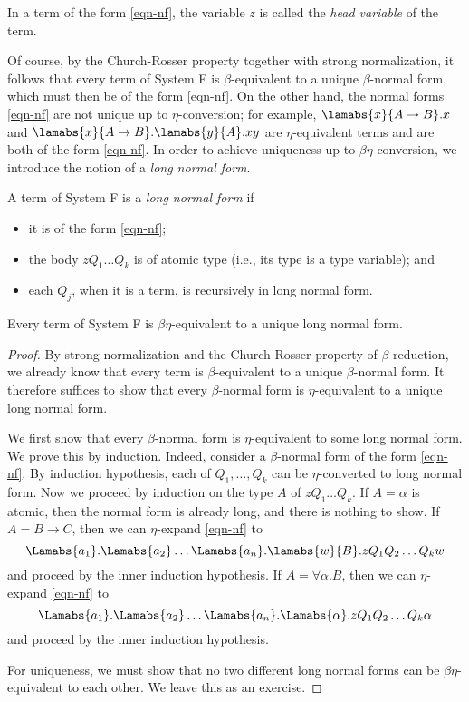 \documentclass[12pt]{article}
\begin{document}
\begin{definition}
  In a term of the form {\eqref{eqn-nf}}, the variable $z$ is called
  the {\em head variable} of the term.
\end{definition}

Of course, by the Church-Rosser property together with strong
normalization, it follows that every term of System F is
$\beta$-equivalent to a unique $\beta$-normal form, which must then be
of the form {\eqref{eqn-nf}}. On the other hand, the normal forms
{\eqref{eqn-nf}} are not unique up to $\eta$-conversion; for example,
$\lamabs{x}{A\to B}.x$ and $\lamabs{x}{A\to B}.\lamabs{y}{A}.xy$ are
$\eta$-equivalent terms and are both of the form {\eqref{eqn-nf}}. 
In order to achieve uniqueness up to $\beta\eta$-conversion, we
introduce the notion of a {\em long normal form}.

\begin{definition}
  A term of System F is a {\em long normal form} if
  \begin{itemize}
  \item it is of the form {\eqref{eqn-nf}};
  \item the body $zQ_1\ldots Q_k$ is of atomic type (i.e., its type is
    a type variable); and
  \item each $Q_j$, when it is a term, is recursively in long normal form.
  \end{itemize}
\end{definition}

\begin{proposition}\label{prop-unique-lnf}
  Every term of System F is $\beta\eta$-equivalent to a unique long
  normal form.
\end{proposition}

\begin{proof}
  By strong normalization and the Church-Rosser property of
  $\beta$-reduction, we already know that every term is
  $\beta$-equivalent to a unique $\beta$-normal form. It therefore
  suffices to show that every $\beta$-normal form is $\eta$-equivalent
  to a unique long normal form.

  We first show that every $\beta$-normal form is $\eta$-equivalent to
  some long normal form. We prove this by induction. Indeed, consider
  a $\beta$-normal form of the form {\eqref{eqn-nf}}. By induction
  hypothesis, each of $Q_1,\ldots,Q_k$ can be $\eta$-converted to long
  normal form. Now we proceed by induction on the type $A$ of
  $zQ_1\ldots Q_k$. If $A=\alpha$ is atomic, then the normal form is
  already long, and there is nothing to show. If $A=B\to C$, then we
  can $\eta$-expand {\eqref{eqn-nf}} to 
  \[
  \Lamabs{a_1}.\Lamabs{a_2}\ldots\Lamabs{a_n}.\lamabs{w}{B}.zQ_1Q_2\ldots Q_kw
  \]
  and proceed by the inner induction hypothesis. If
  $A=\forall\alpha.B$, then we can $\eta$-expand {\eqref{eqn-nf}} to
  \[
  \Lamabs{a_1}.\Lamabs{a_2}\ldots\Lamabs{a_n}.\Lamabs{\alpha}.zQ_1Q_2\ldots Q_k\alpha
  \]
  and proceed by the inner induction hypothesis.

  For uniqueness, we must show that no two different long normal forms
  can be $\beta\eta$-equivalent to each other. We leave this as an
  exercise. \eot
\end{proof}
\end{document}
